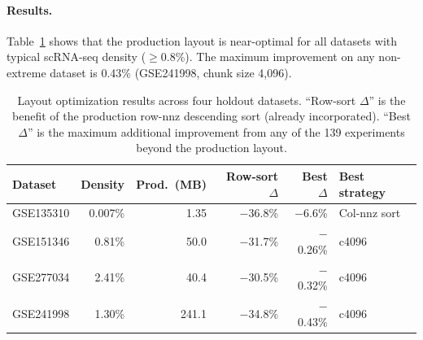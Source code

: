 \documentclass[10pt,twocolumn,letterpaper]{article}
\begin{document}
\paragraph{Results.}
Table~\ref{tab:layout_summary} shows that the production layout is near-optimal for all datasets with typical scRNA-seq density ($\geq$0.8\%).
The maximum improvement on any non-extreme dataset is 0.43\% (GSE241998, chunk size 4{,}096).

\begin{table}[h]
\centering
\caption{Layout optimization results across four holdout datasets. ``Row-sort $\Delta$'' is the benefit of the production row-nnz descending sort (already incorporated). ``Best $\Delta$'' is the maximum additional improvement from any of the 139 experiments beyond the production layout.}
\label{tab:layout_summary}
\footnotesize
\begin{tabular}{lrrrrl}
\toprule
Dataset & Density & Prod.\ (MB) & Row-sort $\Delta$ & Best $\Delta$ & Best strategy \\
\midrule
GSE135310 & 0.007\% & 1.35 & $-$36.8\% & $-$6.6\% & Col-nnz sort \\
GSE151346 & 0.81\% & 50.0 & $-$31.7\% & $-$0.26\% & c4096 \\
GSE277034 & 2.41\% & 40.4 & $-$30.5\% & $-$0.32\% & c4096 \\
GSE241998 & 1.30\% & 241.1 & $-$34.8\% & $-$0.43\% & c4096 \\
\bottomrule
\end{tabular}
\end{table}
\end{document}
